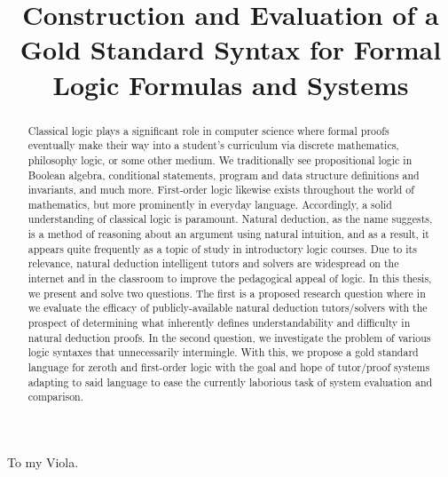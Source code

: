\documentclass[ms]{uncgdissertationexp2}
\title{Construction and Evaluation of a Gold Standard Syntax for Formal Logic Formulas and Systems}
\theoremstyle{plain}
\theoremstyle{definition}
\theoremstyle{remark}
\begin{document}
\frontmatter      %
\begin{abstract}
	Classical logic plays a significant role in computer science where formal proofs eventually make their way into a student's curriculum via discrete mathematics, philosophy logic, or some other medium. We traditionally see propositional logic in Boolean algebra, conditional statements, program and data structure definitions and invariants, and much more. First-order logic likewise exists throughout the world of mathematics, but more prominently in everyday language. Accordingly, a solid understanding of classical logic is paramount. Natural deduction, as the name suggests, is a method of reasoning about an argument using natural intuition, and as a result, it appears quite frequently as a topic of study in introductory logic courses. Due to its relevance, natural deduction intelligent tutors and solvers are widespread on the internet and in the classroom to improve the pedagogical appeal of logic. In this thesis, we present and solve two questions. The first is a proposed research question where in we evaluate the efficacy of publicly-available natural deduction tutors/solvers with the prospect of determining what inherently defines understandability and difficulty in natural deduction proofs. In the second question, we investigate the problem of various logic syntaxes that unnecessarily intermingle. With this, we propose a gold standard language for zeroth and first-order logic with the goal and hope of tutor/proof systems adapting to said language to ease the currently laborious task of system evaluation and comparison. 
\end{abstract}

\maketitlepage

\begin{dedication}
	To my Viola.
\end{dedication}

\makeapprovalpage
\end{document}
